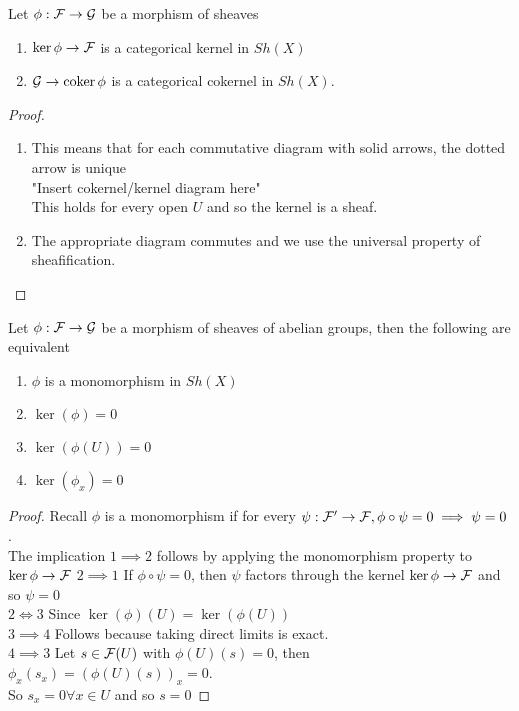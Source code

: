 \documentclass[../main.tex]{subfiles}
\begin{document}
\begin{lemma}
Let $\phi:\mathcal{F}\to \mathcal{G}$ be a morphism of sheaves
\begin{enumerate}
\item $\ker\phi\to \mathcal{F}$ is a categorical kernel in $Sh( X) $ 
\item $\mathcal{G}\to \operatorname{coker}\phi$ is a categorical cokernel in $Sh( X) $.
\end{enumerate}
\end{lemma}
\begin{proof}
	\begin{enumerate}
	\item 
This means that for each commutative diagram with solid arrows, the dotted arrow is unique\\
"Insert cokernel/kernel diagram here"\\
This holds for every open $U$ and so the kernel is a sheaf.
\item The appropriate diagram commutes and we use the universal property of sheafification.
	\end{enumerate}
\end{proof}
\begin{propo}
Let $\phi:\mathcal{F}\to \mathcal{G}$ be a morphism of sheaves of abelian groups, then the following are equivalent
\begin{enumerate}
\item $\phi$ is a monomorphism in $Sh( X) $ 
\item $\ker( \phi) = 0 $ 
\item $\ker ( \phi( U) ) =0$ 
\item $\ker( \phi_x) = 0$ 
\end{enumerate}
\end{propo}
\begin{proof}
Recall $\phi$ is a monomorphism if for every $\psi: \mathcal{F}' \to \mathcal{F} , \phi\circ\psi = 0 \implies \psi= 0$ .\\
The implication $1 \implies 2$ follows by applying the monomorphism property to $\ker \phi \to \mathcal{F}$ 
$2 \implies 1$ If $\phi\circ\psi= 0$, then $\psi$ factors through the kernel $\ker\phi\to \mathcal{F}$ and so $\psi = 0$ \\
$2 \iff 3$ Since $\ker ( \phi) ( U) = \ker ( \phi( U) ) $ \\
$3 \implies 4$  Follows because taking direct limits is exact.\\
$4 \implies 3$ Let $s\in \mathcal{F}( U) $ with $\phi( U) ( s) =0$, then $\phi_x( s_x) = ( \phi( U) ( s) ) _x = 0$.\\
So $s_x =0 \forall x\in U$ and so $s =0$ 
\end{proof}
\end{document}
